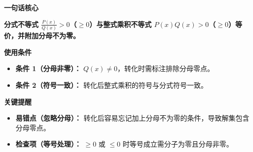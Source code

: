 \begin{summarybox}

	\textbf{\textcolor{CSummary}{一句话核心}}

	\textbf{分式不等式 $\frac{P(x)}{Q(x)}>0$（$\ge 0$）与整式乘积不等式 $P(x)Q(x)>0$（$\ge 0$）等价，并附加分母不为零。}

	\medskip
	\textbf{\textcolor{CSummary}{使用条件}}
	\begin{itemize}[leftmargin=*, itemsep=0.5em, topsep=0.4em]
		\item \textbf{条件 1（分母非零）：} $Q(x)\neq 0$，转化时需标注排除分母零点。
		\item \textbf{条件 2（符号一致）：} 转化后整式乘积的符号与分式符号一致。
	\end{itemize}

	\medskip
	\textbf{\textcolor{CSummary}{关键提醒}}
	\begin{itemize}[leftmargin=*, itemsep=0.5em, topsep=0.4em]
		\item \textbf{易错点（忽略分母）：} 转化后容易忘记加上分母不为零的条件，导致解集包含分母零点。
		\item \textbf{检查项（等号处理）：} $\ge 0$ 或 $\le 0$ 时等号成立需分子为零且分母非零。
	\end{itemize}

\end{summarybox}
